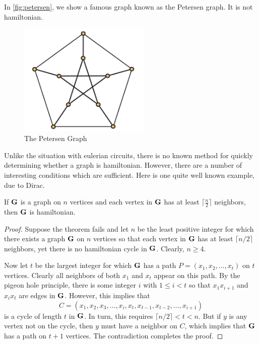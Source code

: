 In \autoref{fig:petersen}, we show a famous graph known
as the Petersen graph. It is not hamiltonian.
\begin{figure}
\begin{center}
\includegraphics*[width=0.56\textwidth]{graphs-figs/petersen_graph}
\caption{\label{fig:petersen}The Petersen Graph}
\end{center}
\end{figure}

Unlike the situation with eulerian circuits, there is no
known method for quickly determining whether a graph is
hamiltonian.  However, there are a number of interesting
conditions which are sufficient.  Here is one quite well
known example, due to Dirac.

\begin{theorem}\label{thm:graphs:dirac}
If $\mathbf{G}$ is a graph on $n$ vertices and each vertex
in $\mathbf{G}$ has at least $\lceil \frac{n}{2}\rceil$ neighbors,
then $\mathbf{G}$ is hamiltonian.
\end{theorem}

\begin{proof}
Suppose the theorem fails and let $n$ be the least positive
integer for which there exists a graph $\mathbf{G}$ on $n$ vertices
so that each vertex in $\mathbf{G}$ has at least $\lceil n/2\rceil$
neighbors, yet there is no hamiltonian cycle in $\mathbf{G}$. Clearly,
$n\ge4$.

Now let $t$ be the largest integer for which $\mathbf{G}$ has
a path $P=(x_1,x_2,\dots,x_t)$ on $t$ vertices.  Clearly all
neighbors of both $x_1$ and $x_t$ appear on this path.  By
the pigeon hole principle, there is some integer $i$ with
$1\le i<t$ so that $x_1x_{i+1}$ and $x_{i}x_t$ are edges
in $\mathbf{G}$.  However, this implies that
\[
C=(x_1,x_2,x_3,\dots,x_i,x_t,x_{t-1},x_{t-2},\dots,x_{i+1})
\]
is a cycle of length $t$ in $\mathbf{G}$. In turn, this 
requires $\lceil n/2\rceil < t<n$.  But if $y$ is any vertex
not on the cycle, then $y$ must have a neighbor on $C$, which
implies that $\mathbf{G}$ has a path on $t+1$ vertices.  The contradiction
completes the proof.
\end{proof}

